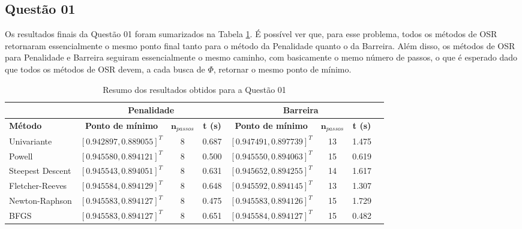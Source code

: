 \documentclass[10pt, a4paper]{article}
\begin{document}
\subsection{Questão 01}

Os resultados finais da Questão 01 foram sumarizados na Tabela \ref{tab:q1_results}. É possível ver que, para esse problema, todos os métodos de OSR retornaram essencialmente
o mesmo ponto final tanto para o método da Penalidade quanto o da Barreira. Além disso, os métodos de OSR para Penalidade e Barreira seguiram essencialmente o mesmo caminho,
com basicamente o memo número de passos, o que é esperado dado que todos os métodos de OSR devem, a cada busca de $\Phi$, retornar o mesmo ponto de mínimo.

\begin{table}[htpb]
  \centering
  \begin{tabular}{|l|c|c|c|c|c|c|c|}
    \multicolumn{1}{c}{} %
    & 
    \multicolumn{3}{c}{\textbf{Penalidade}} \vline
    & 
    \multicolumn{3}{c}{\textbf{Barreira}} \\%
    \hline%
    \textbf{Método}
    &
    \textbf{Ponto de mínimo}
    & 
    $\mathbf{n}_{passos}$
    & 
    \textbf{t (s)}
    &
    \textbf{Ponto de mínimo}
    & 
    $\mathbf{n}_{passos}$
    & 
    \textbf{t (s)}
    \\
    Univariante        & $[0.942897, 0.889055]^T$ &  8 & 0.687 &  $[0.947491, 0.897739]^T$ &  13  & 1.475    \\
    Powell             & $[0.945580, 0.894121]^T$ &  8 & 0.500 &  $[0.945550, 0.894063]^T$ &  15  & 0.619    \\
    Steepest Descent   & $[0.945543, 0.894051]^T$ &  8 & 0.631 &  $[0.945652, 0.894255]^T$ &  14  & 1.617    \\
    Fletcher-Reeves    & $[0.945584, 0.894129]^T$ &  8 & 0.648 &  $[0.945592, 0.894145]^T$ &  13  & 1.307    \\
    Newton-Raphson     & $[0.945583, 0.894127]^T$ &  8 & 0.475 &  $[0.945583, 0.894126]^T$ &  15  & 1.729    \\
    BFGS               & $[0.945583, 0.894127]^T$ &  8 & 0.651 &  $[0.945584, 0.894127]^T$ &  15  & 0.482    \\
    \hline
  \end{tabular}
  \caption{Resumo dos resultados obtidos para a Questão 01}
  \label{tab:q1_results}
\end{table}
\end{document}
